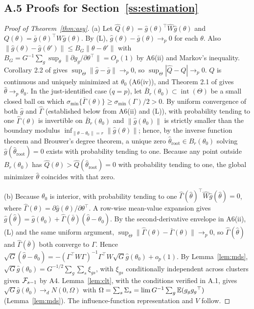 \subsection{A.5 Proofs for Section~\ref{ss:estimation}}

\begin{proof}[Proof of Theorem~\ref{thm:asy}]
(a) Let $\hat Q(\theta)=\hat g(\theta)^{\top}\hat W\hat g(\theta)$ and $Q(\theta)=\bar g(\theta)^{\top}W\bar g(\theta)$.
By (L), $\hat g(\theta)-\bar g(\theta)\to_p0$ for each $\theta$. Also
$\|\hat g(\theta)-\hat g(\theta')\|\le B_G\|\theta-\theta'\|$ with
$B_G=G^{-1}\sum_g\sup_\theta\|\partial g_g/\partial\theta^{\top}\|=O_p(1)$ by A6(ii) and Markov's inequality.
Corollary 2.2 of \citet{newey1991uniform} gives $\sup_\Theta\|\hat g-\bar g\|\to_p0$, so
$\sup_\Theta|\hat Q-Q|\to_p0$. $Q$ is continuous and uniquely minimized at $\theta_0$ (A6(iv)), and
Theorem 2.1 of \citet{newey1994large} gives $\hat\theta\to_p\theta_0$. In the just-identified case
($q=p$), let $\bar B_r(\theta_0)\subset\operatorname{int}(\Theta)$ be a small closed ball on which
$\sigma_{\min}\{\bar\Gamma(\theta)\}\ge \sigma_{\min}(\Gamma)/2>0$. By uniform convergence of both
$\hat g$ and $\hat\Gamma$ (established below from A6(ii) and (L)), with probability tending to one
$\hat\Gamma(\theta)$ is invertible on $\bar B_r(\theta_0)$ and $\|\hat g(\theta_0)\|$ is strictly
smaller than the boundary modulus $\inf_{\|\theta-\theta_0\|=r}\|\hat g(\theta)\|$; hence, by the
inverse function theorem and Brouwer's degree theorem, a unique zero $\hat\theta_{\mathrm{root}}\in B_r(\theta_0)$
solving $\hat g(\hat\theta_{\mathrm{root}})=0$ exists with probability tending to one. Because any
point outside $B_r(\theta_0)$ has $\hat Q(\theta)>\hat Q(\hat\theta_{\mathrm{root}})=0$ with
probability tending to one, the global minimizer $\hat\theta$ coincides with that zero.

(b) Because $\theta_0$ is interior, with probability tending to one
$\hat\Gamma(\hat\theta)^{\top}\hat W\hat g(\hat\theta)=0$, where $\hat\Gamma(\theta)=\partial\hat g(\theta)/\partial\theta^{\top}$.
A row-wise mean-value expansion gives $\hat g(\hat\theta)=\hat g(\theta_0)+\hat\Gamma(\bar\theta)(\hat\theta-\theta_0)$.
By the second-derivative envelope in A6(ii), (L) and the same uniform argument,
$\sup_\Theta\|\hat\Gamma(\theta)-\bar\Gamma(\theta)\|\to_p0$, so $\hat\Gamma(\hat\theta)$ and $\hat\Gamma(\bar\theta)$ both
converge to $\Gamma$. Hence
$\sqrt G(\hat\theta-\theta_0)=-(\Gamma^{\top}W\Gamma)^{-1}\Gamma^{\top}W\sqrt G\hat g(\theta_0)+o_p(1)$. By
Lemma~\ref{lem:mds}, $\sqrt G\hat g(\theta_0)=G^{-1/2}\sum_g\sum_s\xi_{gs}$, with $\xi_{gs}$ conditionally
independent across clusters given $\mathcal{F}_{s-1}$ by A4. Lemma~\ref{lem:clt}, with the conditions
verified in A.1, gives $\sqrt G\hat g(\theta_0)\to_dN(0,\Omega)$ with
$\Omega=\sum_s\Sigma_s=\lim G^{-1}\sum_g\mathbb{E}(g_gg_g{}^{\top})$ (Lemma~\ref{lem:mds}). The influence-function
representation and $V$ follow.


\end{proof}
